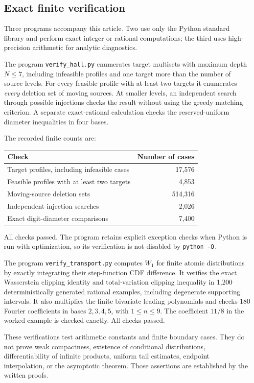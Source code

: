 \documentclass[11pt,letterpaper]{article}
\theoremstyle{definition}
\theoremstyle{remark}
\begin{document}
\subsection{Exact finite verification}
Three programs accompany this article. Two use only the Python standard library and perform exact integer or rational computations; the third uses high-precision arithmetic for analytic diagnostics.

The program \texttt{verify\_hall.py} enumerates target multisets with maximum depth $N\le7$, including infeasible profiles and one target more than the number of source levels. For every feasible profile with at least two targets it enumerates \emph{every} deletion set of moving sources. At smaller levels, an independent search through possible injections checks the result without using the greedy matching criterion. A separate exact-rational calculation checks the reserved-uniform diameter inequalities in four bases.

The recorded finite counts are:
\begin{center}
\begin{tabular}{lr}
\toprule
Check & Number of cases\\
\midrule
Target profiles, including infeasible cases & 17,576\\
Feasible profiles with at least two targets & 4,853\\
Moving-source deletion sets & 514,316\\
Independent injection searches & 2,026\\
Exact digit-diameter comparisons & 7,400\\
\bottomrule
\end{tabular}
\end{center}
All checks passed. The program retains explicit exception checks when Python is run with optimization, so its verification is not disabled by \texttt{python -O}.

The program \texttt{verify\_transport.py} computes $W_1$ for finite atomic distributions by exactly integrating their step-function CDF difference. It verifies the exact Wasserstein clipping identity and total-variation clipping inequality in 1,200 deterministically generated rational examples, including degenerate supporting intervals. It also multiplies the finite bivariate leading polynomials and checks 180 Fourier coefficients in bases $2,3,4,5$, with $1\le n\le9$. The coefficient $11/8$ in the worked example is checked exactly. All checks passed.

These verifications test arithmetic constants and finite boundary cases. They do not prove weak compactness, existence of conditional distributions, differentiability of infinite products, uniform tail estimates, endpoint interpolation, or the asymptotic theorem. Those assertions are established by the written proofs.
\end{document}
